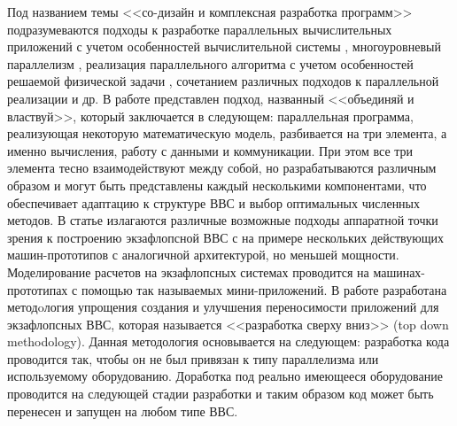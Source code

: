 Под названием темы <<со-дизайн и комплексная разработка программ>> подразумеваются подходы к разработке параллельных 
вычислительных приложений с учетом особенностей вычислительной системы \cite{Poghosyan2015167}, 
многоуровневый параллелизм \cite{Jacobsen20131,Liu2011261}, реализация параллельного алгоритма с учетом особенностей решаемой физической задачи \cite{Rycerz20131116}, 
сочетанием различных подходов к параллельной реализации \cite{Chakroun20131563,Jin2011562} и др.      
В работе \cite{Emad2016} представлен подход, названный <<объединяй и властвуй>>, который заключается в следующем: параллельная программа, реализующая некоторую математическую модель, разбивается на три элемента, а именно вычисления, работу с данными и коммуникации. При этом все три элемента тесно взаимодействуют между собой, но  разрабатываются различным образом и могут быть представлены каждый несколькими компонентами, что обеспечивает адаптацию к структуре ВВС и выбор оптимальных численных методов. 
В статье \cite{Dosanjh2014} излагаются различные возможные подходы аппаратной точки зрения к построению экзафлопсной ВВС с  на примере нескольких действующих машин-прототипов с аналогичной архитектурой, но меньшей мощности. Моделирование расчетов на экзафлопсных системах проводится на машинах-прототипах с помощью так называемых мини-приложений. 
В работе \cite{Subotic2013450} разработана методoлогия упрощения создания и улучшения переносимости приложений для экзафлопсных ВВС, которая называется <<разработка сверху вниз>> (top down methodology). Данная методология основывается на следующем: разработка кода проводится так, чтобы он не был привязан к типу параллелизма или используемому оборудованию. Доработка под реально имеющееся оборудование  проводится на следующей стадии разработки и таким образом код может быть перенесен и запущен на любом типе ВВС.





